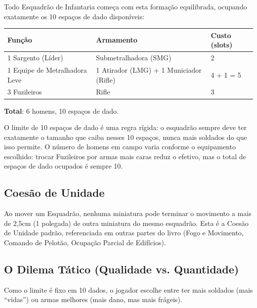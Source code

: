 Todo Esquadrão de Infantaria começa com esta formação equilibrada, ocupando exatamente os 10 espaços de dado disponíveis:

\begin{center}
\begin{tabular}{p{4.4cm}p{4.8cm}p{2.4cm}}
\toprule
Função & Armamento & Custo (slots) \\
\midrule
1 Sargento (Líder) & Submetralhadora (SMG) & 2 \\
1 Equipe de Metralhadora Leve & 1 Atirador (LMG) + 1 Municiador (Rifle) & 4 + 1 = 5 \\
3 Fuzileiros & Rifle & 3 \\
\bottomrule
\end{tabular}
\end{center}

\textbf{Total}: 6 homens, 10 espaços de dado.

\begin{nota}
O limite de 10 espaços de dado é uma regra rígida: o esquadrão sempre deve ter exatamente o tamanho que caiba nesses 10 espaços, nunca mais soldados do que isso permite. O número de homens em campo varia conforme o equipamento escolhido: trocar Fuzileiros por armas mais caras reduz o efetivo, mas o total de espaços de dado ocupados é sempre 10.
\end{nota}

\subsection{Coesão de Unidade}

Ao mover um Esquadrão, nenhuma miniatura pode terminar o movimento a mais de 2,5cm (1 polegada) de outra miniatura do mesmo esquadrão. Esta é a Coesão de Unidade padrão, referenciada em outras partes do livro (Fogo e Movimento, Comando de Pelotão, Ocupação Parcial de Edifícios).

\subsection{O Dilema Tático (Qualidade vs. Quantidade)}

Como o limite é fixo em 10 dados, o jogador escolhe entre ter mais soldados (mais ``vidas'') ou armas melhores (mais dano, mas mais frágeis).

